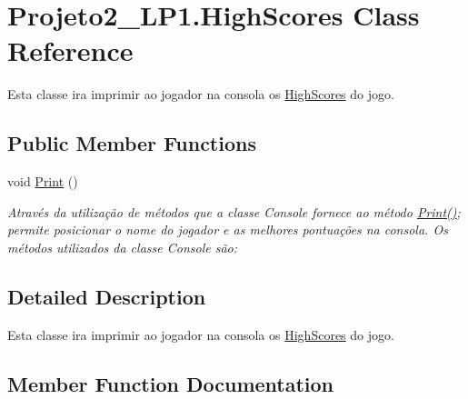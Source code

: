 \hypertarget{class_projeto2___l_p1_1_1_high_scores}{}\section{Projeto2\+\_\+\+L\+P1.\+High\+Scores Class Reference}
\label{class_projeto2___l_p1_1_1_high_scores}


Esta classe ira imprimir ao jogador na consola os \mbox{\hyperlink{class_projeto2___l_p1_1_1_high_scores}{High\+Scores}} do jogo.  


\subsection*{Public Member Functions}
\begin{DoxyCompactItemize}
\item 
void \mbox{\hyperlink{class_projeto2___l_p1_1_1_high_scores_af4ca1660307f8f8154bc44e1dfe9ff16}{Print}} ()
\begin{DoxyCompactList}\small\item\em Através da utilização de métodos que a classe Console fornece ao método \mbox{\hyperlink{class_projeto2___l_p1_1_1_high_scores_af4ca1660307f8f8154bc44e1dfe9ff16}{Print()}}; permite posicionar o nome do jogador e as melhores pontuações na consola. Os métodos utilizados da classe Console são\+: \end{DoxyCompactList}\end{DoxyCompactItemize}


\subsection{Detailed Description}
Esta classe ira imprimir ao jogador na consola os \mbox{\hyperlink{class_projeto2___l_p1_1_1_high_scores}{High\+Scores}} do jogo. 



\subsection{Member Function Documentation}
\mbox{\label{class_projeto2___l_p1_1_1_high_scores_af4ca1660307f8f8154bc44e1dfe9ff16}} 
